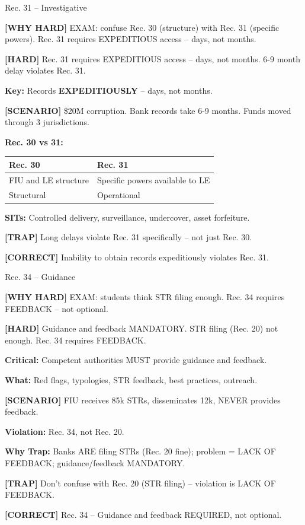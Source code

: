 \documentclass[6pt,aspectratio=169,fontsize=5pt]{beamer}
\renewcommand{\tiny}{\fontsize{3.5pt}{4.5pt}\selectfont}
\renewcommand{\normalsize}{\fontsize{7.5pt}{8.5pt}\selectfont}
\newcommand{\trap}[1]{%
	\begin{block}{\textcolor{redtrap}{\textbf{[TRAP]}}}
		\textcolor{redtrap}{\tiny #1}
	\end{block}
}
\newcommand{\scenario}[1]{%
	\begin{block}{\textbf{[SCENARIO]}}
		\tiny #1
	\end{block}
}
\newcommand{\correct}[1]{%
	\begin{block}{\textcolor{greencorrect}{\textbf{[CORRECT]}}}
		\textcolor{greencorrect}{\tiny #1}
	\end{block}
}
\newcommand{\hard}[1]{%
	\begin{block}{\textcolor{hardcolor}{\textbf{[HARD]}}}
		\textcolor{hardcolor}{\tiny #1}
	\end{block}
}
\newcommand{\hardexplain}[1]{%
	\begin{block}{\textcolor{orangehard}{\textbf{[WHY HARD]}}}
		\textcolor{orangehard}{\tiny #1}
	\end{block}
}
\begin{document}
	\begin{frame}{\normalsize Rec. 31 -- Investigative}
		
		\hardexplain{EXAM: confuse Rec. 30 (structure) with Rec. 31 (specific powers). Rec. 31 requires EXPEDITIOUS access -- days, not months.}
		
		\hard{Rec. 31 requires EXPEDITIOUS access -- days, not months. 6-9 month delay violates Rec. 31.}
		
		\textbf{Key:} Records \textbf{EXPEDITIOUSLY} -- days, not months.
		
		\scenario{\$20M corruption. Bank records take 6-9 months. Funds moved through 3 jurisdictions.}
		
		\textbf{Rec. 30 vs 31:}
		\begin{table}
			\begin{tabular}{|p{3.5cm}|p{3.5cm}|}
				\hline
				\textbf{Rec. 30} & \textbf{Rec. 31} \\
				\hline
				FIU and LE structure & Specific powers available to LE \\
				\hline
				Structural & Operational \\
				\hline
			\end{tabular}
		\end{table}
		
		\textbf{SITs:} Controlled delivery, surveillance, undercover, asset forfeiture.
		
		\trap{Long delays violate Rec. 31 specifically -- not just Rec. 30.}
		
		\correct{Inability to obtain records expeditiously violates Rec. 31.}
	\end{frame}
	
	\begin{frame}{\normalsize Rec. 34 -- Guidance}
		
		\hardexplain{EXAM: students think STR filing enough. Rec. 34 requires FEEDBACK -- not optional.}
		
		\hard{Guidance and feedback MANDATORY. STR filing (Rec. 20) not enough. Rec. 34 requires FEEDBACK.}
		
		\textbf{Critical:} Competent authorities MUST provide guidance and feedback.
		
		\textbf{What:} Red flags, typologies, STR feedback, best practices, outreach.
		
		\scenario{FIU receives 85k STRs, disseminates 12k, NEVER provides feedback.}
		
		\textbf{Violation:} Rec. 34, not Rec. 20.
		
		\textbf{Why Trap:} Banks ARE filing STRs (Rec. 20 fine); problem = LACK OF FEEDBACK; guidance/feedback MANDATORY.
		
		\trap{Don't confuse with Rec. 20 (STR filing) -- violation is LACK OF FEEDBACK.}
		
		\correct{Rec. 34 -- Guidance and feedback REQUIRED, not optional.}
	\end{frame}
	
\end{document}
